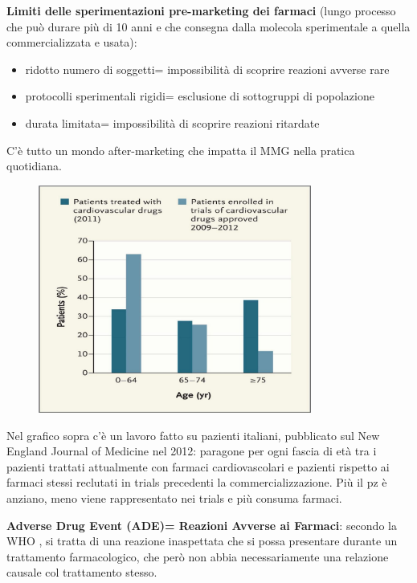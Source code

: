   \textbf{Limiti delle sperimentazioni pre-marketing dei farmaci} (lungo
  processo che può durare più di 10 anni e che consegna dalla molecola
  sperimentale a quella commercializzata e usata):

\begin{itemize}
\item
  ridotto numero di soggetti= impossibilità di scoprire reazioni avverse
  rare
\item
  protocolli sperimentali rigidi= esclusione di sottogruppi di
  popolazione
\item
  durata limitata= impossibilità di scoprire reazioni ritardate
\end{itemize}

  C'è tutto un mondo after-marketing che impatta il MMG nella pratica
  quotidiana.

\begin{figure}[!ht]
\centering
	\includegraphics[width=0.8\textwidth]{37/image1.jpg}
	\end{figure}

  Nel grafico sopra c'è un lavoro fatto su pazienti italiani, pubblicato
  sul New England Journal of Medicine nel 2012: paragone per ogni fascia
  di età tra i pazienti trattati attualmente con farmaci cardiovascolari
  e pazienti rispetto ai farmaci stessi reclutati in trials precedenti
  la commercializzazione. Più il pz è anziano, meno viene rappresentato
  nei trials e più consuma farmaci.

  \textbf{Adverse Drug Event (ADE)= Reazioni Avverse ai Farmaci}:
  secondo la WHO , si tratta di una reazione inaspettata che si possa
  presentare durante un trattamento farmacologico, che però non abbia
  necessariamente una relazione causale col trattamento stesso.

